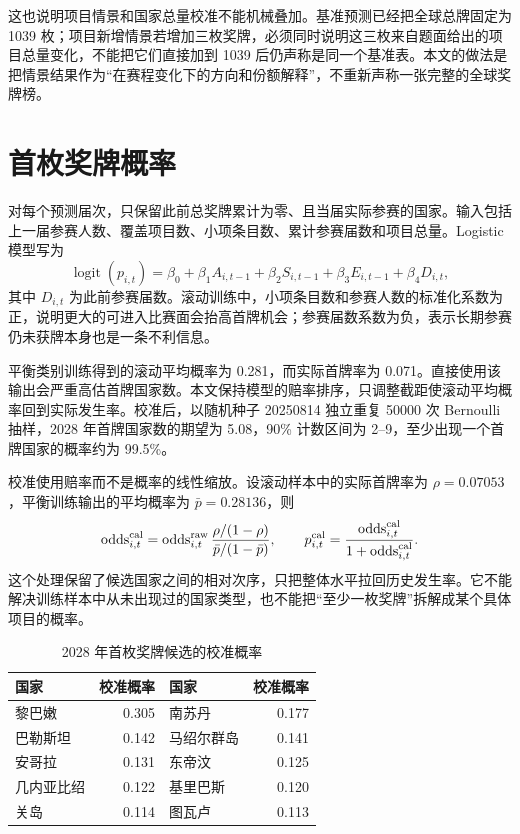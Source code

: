 \documentclass[UTF8,11pt,a4paper]{ctexart}
\begin{document}
这也说明项目情景和国家总量校准不能机械叠加。基准预测已经把全球总牌固定为 1039 枚；项目新增情景若增加三枚奖牌，必须同时说明这三枚来自题面给出的项目总量变化，不能把它们直接加到 1039 后仍声称是同一个基准表。本文的做法是把情景结果作为“在赛程变化下的方向和份额解释”，不重新声称一张完整的全球奖牌榜。

\label{mcm-q3-end}
\label{mcm-q2-start}
\section{首枚奖牌概率}

对每个预测届次，只保留此前总奖牌累计为零、且当届实际参赛的国家。输入包括上一届参赛人数、覆盖项目数、小项条目数、累计参赛届数和项目总量。Logistic 模型写为
\begin{equation}
\operatorname{logit}(p_{i,t})=\beta_0+\beta_1A_{i,t-1}
+\beta_2S_{i,t-1}+\beta_3E_{i,t-1}+\beta_4D_{i,t},
\end{equation}
其中 $D_{i,t}$ 为此前参赛届数。滚动训练中，小项条目数和参赛人数的标准化系数为正，说明更大的可进入比赛面会抬高首牌机会；参赛届数系数为负，表示长期参赛仍未获牌本身也是一条不利信息。

平衡类别训练得到的滚动平均概率为 0.281，而实际首牌率为 0.071。直接使用该输出会严重高估首牌国家数。本文保持模型的赔率排序，只调整截距使滚动平均概率回到实际发生率。校准后，以随机种子 20250814 独立重复 50000 次 Bernoulli 抽样，2028 年首牌国家数的期望为 5.08，90\% 计数区间为 2--9，至少出现一个首牌国家的概率约为 99.5\%。

校准使用赔率而不是概率的线性缩放。设滚动样本中的实际首牌率为 $\rho=0.07053$，平衡训练输出的平均概率为 $\bar p=0.28136$，则
\begin{equation}
\operatorname{odds}^{\rm cal}_{i,t}=\operatorname{odds}^{\rm raw}_{i,t}
\frac{\rho/(1-\rho)}{\bar p/(1-\bar p)},\qquad
p^{\rm cal}_{i,t}=\frac{\operatorname{odds}^{\rm cal}_{i,t}}
{1+\operatorname{odds}^{\rm cal}_{i,t}}.
\end{equation}
这个处理保留了候选国家之间的相对次序，只把整体水平拉回历史发生率。它不能解决训练样本中从未出现过的国家类型，也不能把“至少一枚奖牌”拆解成某个具体项目的概率。

\begin{table}[H]
\centering
\caption{2028 年首枚奖牌候选的校准概率}
\label{tab:first-medal-top}
\small
\begin{tabular}{lrlr}
\toprule
国家 & 校准概率 & 国家 & 校准概率\\
\midrule
黎巴嫩 & 0.305 & 南苏丹 & 0.177\\
巴勒斯坦 & 0.142 & 马绍尔群岛 & 0.141\\
安哥拉 & 0.131 & 东帝汶 & 0.125\\
几内亚比绍 & 0.122 & 基里巴斯 & 0.120\\
关岛 & 0.114 & 图瓦卢 & 0.113\\
\bottomrule
\end{tabular}
\end{table}
\end{document}
